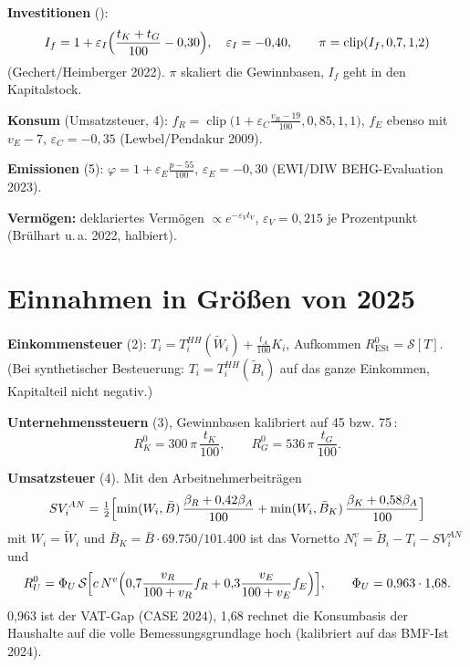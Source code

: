 \textbf{Investitionen} ():
\begin{equation}
I_f=1+\varepsilon_I\Bigl(\frac{t_K+t_G}{100}-0{,}30\Bigr),\quad \varepsilon_I=-0{,}40,\qquad
\pi=\operatorname{clip}(I_f,0{,}7,1{,}2)
\end{equation}
(Gechert/Heimberger 2022). $\pi$ skaliert die Gewinnbasen, $I_f$ geht in den Kapitalstock.

\textbf{Konsum} (Umsatzsteuer, 4): $f_R=\operatorname{clip}\bigl(1+\varepsilon_C\frac{v_R-19}{100},0{,}85,1{,}1\bigr)$,
$f_E$ ebenso mit $v_E-7$, $\varepsilon_C=-0{,}35$ (Lewbel/Pendakur 2009).

\textbf{Emissionen} (5): $\varphi=1+\varepsilon_E\frac{p-55}{100}$, $\varepsilon_E=-0{,}30$
(EWI/DIW BEHG-Evaluation 2023).

\textbf{Vermögen:} deklariertes Vermögen $\propto e^{-\varepsilon_Vt_V}$, $\varepsilon_V=0{,}215$ je
Prozentpunkt (Brülhart u.\,a. 2022, halbiert).

\section{Einnahmen in Größen von 2025}

\textbf{Einkommensteuer} (2): $T_i=T^{HH}_i(\tilde W_i)+\frac{t_A}{100}K_i$,
Aufkommen $R^0_{\text{ESt}}=\mathcal S[T]$. (Bei synthetischer Besteuerung:
$T_i=T^{HH}_i(\tilde B_i)$ auf das ganze Einkommen, Kapitalteil nicht negativ.)

\textbf{Unternehmenssteuern} (3), Gewinnbasen kalibriert auf 45 bzw. 75\,\Mrd:
\begin{equation}
R^0_K=300\,\pi\,\frac{t_K}{100},\qquad R^0_G=536\,\pi\,\frac{t_G}{100}.
\end{equation}

\textbf{Umsatzsteuer} (4). Mit den Arbeitnehmerbeiträgen
\begin{equation}
SV^{AN}_i=\tfrac12\Bigl[\min(W_i,\bar B)\,\frac{\beta_R+0{,}42\beta_A}{100}+\min(W_i,\bar B_K)\,\frac{\beta_K+0{,}58\beta_A}{100}\Bigr]
\end{equation}
mit $W_i=\tilde W_i$ und $\bar B_K=\bar B\cdot69.750/101.400$
ist das Vornetto $N^v_i=\tilde B_i-T_i-SV^{AN}_i$ und
\begin{equation}
R^0_U=\Phi_U\,\mathcal S\Bigl[c\,N^v\Bigl(0{,}7\frac{v_R}{100+v_R}f_R+0{,}3\frac{v_E}{100+v_E}f_E\Bigr)\Bigr],\qquad
\Phi_U=0{,}963\cdot1{,}68.
\end{equation}
0,963 ist der VAT-Gap (CASE 2024), 1,68 rechnet die Konsumbasis der Haushalte auf die volle
Bemessungsgrundlage hoch (kalibriert auf das BMF-Ist 2024).

